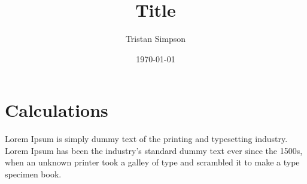 \documentclass{article}
\title{Title}
\author{Tristan Simpson}
\date{\today}
\begin{document}
\maketitle


\section*{Calculations} {
    Lorem Ipsum is simply dummy text of the printing and typesetting industry. Lorem Ipsum has been the industry's standard dummy text ever since the 1500s, when an unknown printer took a galley of type and scrambled it to make a type specimen book.
}
\end{document}

